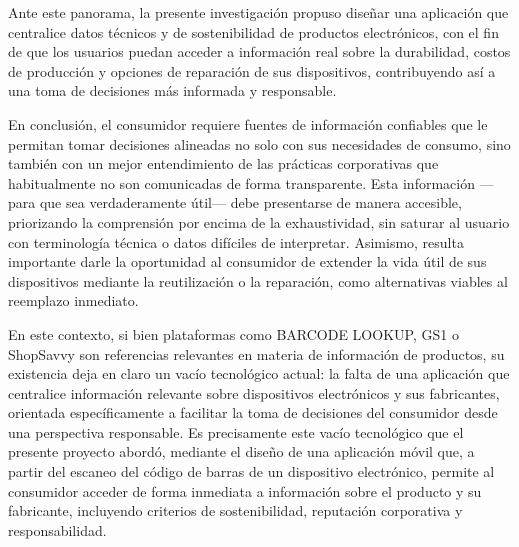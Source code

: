Ante este panorama, la presente investigación propuso diseñar una aplicación que
centralice datos técnicos y de sostenibilidad de productos electrónicos, con el
fin de que los usuarios puedan acceder a información real sobre la durabilidad,
costos de producción y opciones de reparación de sus dispositivos, contribuyendo
así a una toma de decisiones más informada y responsable. 

En conclusión, el consumidor requiere fuentes de información confiables que le
permitan tomar decisiones alineadas no solo con sus necesidades de consumo, sino
también con un mejor entendimiento de las prácticas corporativas que
habitualmente no son comunicadas de forma transparente. Esta información —para
que sea verdaderamente útil— debe presentarse de manera accesible, priorizando
la comprensión por encima de la exhaustividad, sin saturar al usuario con
terminología técnica o datos difíciles de interpretar. Asimismo, resulta
importante darle la oportunidad al consumidor de extender la vida útil de sus
dispositivos mediante la reutilización o la reparación, como alternativas
viables al reemplazo inmediato. 

En este contexto, si bien plataformas como BARCODE LOOKUP, GS1 o ShopSavvy son
referencias relevantes en materia de información de productos, su existencia
deja en claro un vacío tecnológico actual: la falta de una aplicación que
centralice información relevante sobre dispositivos electrónicos y sus
fabricantes, orientada específicamente a facilitar la toma de decisiones del
consumidor desde una perspectiva responsable. Es precisamente este vacío
tecnológico que el presente proyecto abordó, mediante el diseño de una
aplicación móvil que, a partir del escaneo del código de barras de un
dispositivo electrónico, permite al consumidor acceder de forma inmediata a
información sobre el producto y su fabricante, incluyendo criterios de
sostenibilidad, reputación corporativa y responsabilidad.